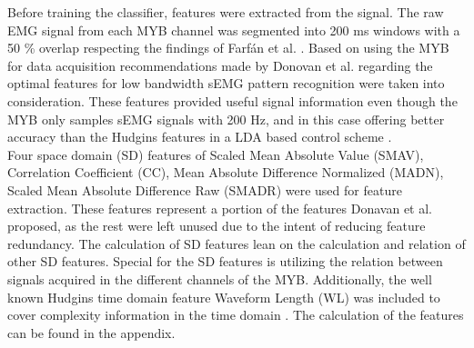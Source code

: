 	
Before training the classifier, features were extracted from the signal. The raw EMG signal from each MYB channel was segmented into 200 ms windows with a 50 \% overlap respecting the findings of Farfán et al. \cite{Farfan2010}. Based on using the MYB for data acquisition recommendations made by Donovan et al. \cite{Donovan2017} regarding the optimal features for low bandwidth sEMG pattern recognition were taken into consideration. These features provided useful signal information even though the MYB only samples sEMG signals with 200 Hz, and in this case offering better accuracy than the Hudgins features \cite{Hudgins1993} in a LDA based control scheme \cite{Donovan2017}. \\
Four space domain (SD) features of Scaled Mean Absolute Value (SMAV), Correlation Coefficient (CC), Mean Absolute Difference Normalized (MADN), Scaled Mean Absolute Difference Raw (SMADR) were used for feature extraction. These features represent a portion of the features Donavan et al. \cite{Donovan2017} proposed, as the rest were left unused due to the intent of reducing feature redundancy. The calculation of SD features lean on the calculation and relation of other SD features. Special for the SD features is utilizing the relation between signals acquired in the different channels of the MYB. Additionally, the well known Hudgins time domain feature Waveform Length (WL) was included to cover complexity information in the time domain \cite{Phiny2012}. The calculation of the features can be found in the appendix. %
